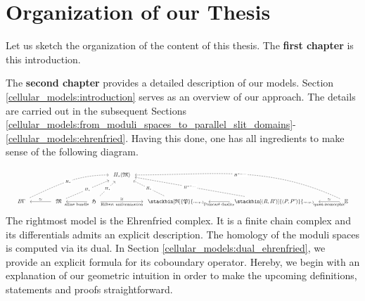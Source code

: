 \section{Organization of our Thesis}

Let us sketch the organization of the content of this thesis. The {\bf first chapter} is this introduction.

The {\bf second chapter} provides a detailed description of our models.
Section \ref{cellular_models:introduction} serves as an overview of our approach.
The details are carried out in the subsequent Sections \ref{cellular_models:from_moduli_spaces_to_parallel_slit_domains}-\ref{cellular_models:ehrenfried}.
Having this done, one has all ingredients to make sense of the following diagram.
\[
    \resizebox{\linewidth}{!}{
        \begin{tikzcd}[row sep=7.5ex, scale=1.3, ampersand replacement=\&]
            \&\&\&\&\&H_\ast(\mathfrak M) \\
            B\Gamma \arrow[<-, shorten <=1ex, shorten >=1ex]{rr}{\simeq} \arrow[dashed, out=25, in=180, shorten <=1ex, shorten >=1ex]{rrrrru}[description]{H_\ast} \&\&
            \mathfrak M \arrow[<-, shorten <=1ex, shorten >=1ex]{rr}[swap]{\text{affine bundle}} \arrow[dashed, shorten <=1ex, shorten >=1ex]{rrru}[description]{H_\ast} \&\&
            \mathfrak H \arrow[shorten <=1ex, shorten >=1ex]{rr}{\cong}[swap]{\text{Hilbert uniformization}} \arrow[dashed, shorten <=1ex, shorten >=1ex]{ru}[description]{H_\ast} \&\&
            \stackbin[\mathfrak R]{\mathfrak P}{\scriptscriptstyle{resp.}} \arrow[<-, shorten <=1ex, shorten >=1ex]{rr}[swap]{\text{Poincaré duality}} \arrow[dashed, shorten <=1ex, shorten >=1ex]{lu}[description]{H_\ast} \&\&
            \stackbin[(R,R')]{(P,P')}{\scriptscriptstyle{resp.}} \arrow[<-, shorten <=1ex, shorten >=1ex]{rr}{\simeq}[swap]{\text{quasi-isomorphic}} \arrow[dashed, shorten <=1ex, shorten >=1ex]{lllu}[description]{H^{\ast-\ldots}} \&\&
            \E \arrow[dashed, out=155, in=0, shorten <=1ex, shorten >=1ex]{lllllu}[description]{H^{\ast-\ldots}}
        \end{tikzcd}
    }
\]
The rightmost model is the Ehrenfried complex.
It is a finite chain complex and its differentials admits an explicit description.
The homology of the moduli spaces is computed via its dual.
In Section \ref{cellular_models:dual_ehrenfried}, we provide an explicit formula for its coboundary operator.
Hereby, we begin with an explanation of our geometric intuition in order to make the upcoming definitions, statements and proofs straightforward.

